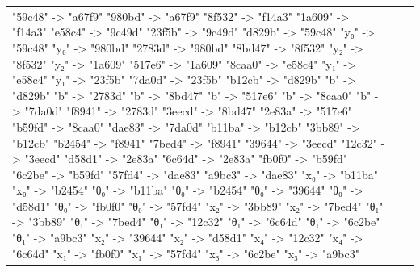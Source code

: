 \documentclass{beamer}
\begin{document}
\begin{frame}[fragile]
\begin{table}[H]
\begin{tabular}{lll}
\begin{adjustbox}{minipage={.4\textwidth}, height=0.22\textwidth, margin*=0cm 0cm 0cm 0.1cm}
{                        "59c48" -> "a67f9"
                        "980bd" -> "a67f9"
                        "8f532" -> "f14a3"
                        "1a609" -> "f14a3"
                        "e58c4" -> "9c49d"
                        "23f5b" -> "9c49d"
                        "d829b" -> "59c48"
                        "y₀" -> "59c48"
                        "y₀" -> "980bd"
                        "2783d" -> "980bd"
                        "8bd47" -> "8f532"
                        "y₂" -> "8f532"
                        "y₂" -> "1a609"
                        "517e6" -> "1a609"
                        "8caa0" -> "e58c4"
                        "y₁" -> "e58c4"
                        "y₁" -> "23f5b"
                        "7da0d" -> "23f5b"
                        "b12cb" -> "d829b"
                        "b" -> "d829b"
                        "b" -> "2783d"
                        "b" -> "8bd47"
                        "b" -> "517e6"
                        "b" -> "8caa0"
                        "b" -> "7da0d"
                        "f8941" -> "2783d"
                        "3eecd" -> "8bd47"
                        "2e83a" -> "517e6"
                        "b59fd" -> "8caa0"
                        "dae83" -> "7da0d"
                        "b11ba" -> "b12cb"
                        "3bb89" -> "b12cb"
                        "b2454" -> "f8941"
                        "7bed4" -> "f8941"
                        "39644" -> "3eecd"
                        "12c32" -> "3eecd"
                        "d58d1" -> "2e83a"
                        "6c64d" -> "2e83a"
                        "fb0f0" -> "b59fd"
                        "6c2be" -> "b59fd"
                        "57fd4" -> "dae83"
                        "a9bc3" -> "dae83"
                        "x₀" -> "b11ba"
                        "x₀" -> "b2454"
                        "θ₀" -> "b11ba"
                        "θ₀" -> "b2454"
                        "θ₀" -> "39644"
                        "θ₀" -> "d58d1"
                        "θ₀" -> "fb0f0"
                        "θ₀" -> "57fd4"
                        "x₂" -> "3bb89"
                        "x₂" -> "7bed4"
                        "θ₁" -> "3bb89"
                        "θ₁" -> "7bed4"
                        "θ₁" -> "12c32"
                        "θ₁" -> "6c64d"
                        "θ₁" -> "6c2be"
                        "θ₁" -> "a9bc3"
                        "x₂" -> "39644"
                        "x₂" -> "d58d1"
                        "x₄" -> "12c32"
                        "x₄" -> "6c64d"
                        "x₁" -> "fb0f0"
                        "x₁" -> "57fd4"
                        "x₃" -> "6c2be"
                        "x₃" -> "a9bc3"
                    }
                \end{adjustbox}
            \end{tabular}
        \end{table}
    \end{frame}
\end{document}
